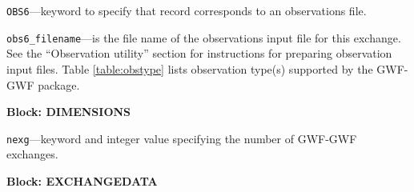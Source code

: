 \begin{description}
\item \texttt{OBS6}---keyword to specify that record corresponds to an observations file.

\item \texttt{obs6\_filename}---is the file name of the observations input file for this exchange. See the ``Observation utility'' section for instructions for preparing observation input files. Table \ref{table:obstype} lists observation type(s) supported by the GWF-GWF package.

\end{description}
\item \textbf{Block: DIMENSIONS}

\begin{description}
\item \texttt{nexg}---keyword and integer value specifying the number of GWF-GWF exchanges.

\end{description}
\item \textbf{Block: EXCHANGEDATA}

